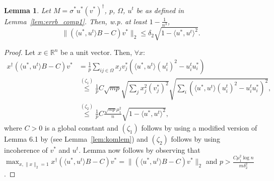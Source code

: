 \documentclass[11pt]{article}
\theoremstyle{plain}
\newtheorem{lemma}[theorem]{Lemma}
\theoremstyle{definition}
\newcommand{\rn}{\mathbb{R}^n}
\newcommand{\so}{\sigma^*}
\newcommand{\ut}{u^t}
\newcommand{\uo}{u^* }
\newcommand{\vo}{v^* }
\newcommand{\ip}[2]{\langle #1, #2 \rangle}
\begin{document}
\begin{lemma}\label{lem:bccompbound}
Let $M=\so\uo(\vo)^\dag$, $p$, $\Omega$, $\ut$ be as defined in Lemma~\ref{lem:errb_comp1}. 
Then, w.p. at least $1-\frac{1}{n^3}$,
$$\|(\ip{\uo}{\ut}B-C)\vo\|_2\leq \delta_2\sqrt{1-\ip{\uo}{\ut}^2}. $$
\end{lemma}
\begin{proof}
Let $x\in \rn$ be a unit vector. Then, $\forall x$: 
\begin{align}
x^\dag(\ip{\uo}{\ut}B-C)\vo&=\frac{1}{p}\sum_{ij\in \Omega}x_j\vo_j(\ip{\uo}{\ut}(\ut_i)^2-\ut_i\uo_i)\nonumber\\
&\stackrel{(\zeta_1)}{\leq} \frac{1}{p}C\sqrt{mp}\sqrt{\sum_j x_j^2(\vo_j)^2}\sqrt{\sum_i(\ip{\uo}{\ut}(\ut_i)^2-\ut_i\uo_i)^2}, \nonumber\\
&\stackrel{(\zeta_2)}{\leq}\frac{1}{p}C\frac{\sqrt{mp}\mu_1^2}{n} \sqrt{1-\ip{\uo}{\ut}^2},
\end{align}
where $C>0$ is a global constant and $(\zeta_1)$ follows by using a modified version of Lemma 6.1 by \cite{KeshavanOM2009} (see Lemma~\ref{lem:komlem}) and $(\zeta_2)$ follows by using incoherence of $\vo$ and $\ut$. Lemma now follows by observing that $\max_{x, \|x\|_2=1} x^\dag(\ip{\uo}{\ut}B-C)\vo=\|(\ip{\uo}{\ut}B-C)\vo\|_2$ and $p>\frac{C\mu_1^2\log n}{m\delta_2^2}$.
\end{proof}
\end{document}

